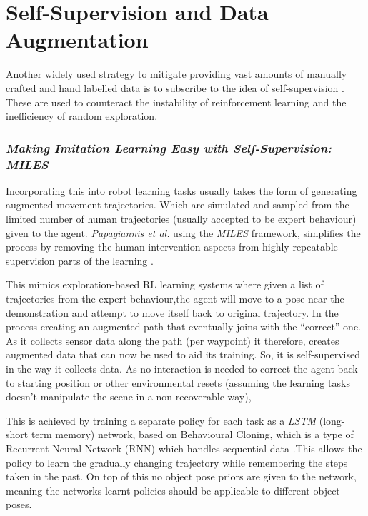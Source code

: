 \section{Self-Supervision and Data Augmentation}
Another widely used strategy to mitigate providing vast amounts of manually crafted and hand labelled data is to subscribe to the idea of self-supervision . These are used to counteract the instability of reinforcement learning and the inefficiency of random exploration.

\subsubsection{\emph{Making Imitation Learning Easy with Self-Supervision: MILES}}
Incorporating this into robot learning tasks usually takes the form of generating augmented movement trajectories. Which are simulated and sampled from the limited number of human trajectories (usually accepted to be expert behaviour) given to the agent. \emph{Papagiannis et al.} using the \emph{MILES} framework, simplifies the process by removing the human intervention aspects from highly repeatable supervision parts of the learning \cite{papagiannis2024milesmakingimitationlearning}. 

This mimics exploration-based RL learning systems where given a list of trajectories from the expert behaviour,the agent will move to a pose near the demonstration and attempt to move itself back to original trajectory. In the process creating an augmented path that eventually joins with the ``correct'' one. As it collects sensor data along the path (per waypoint) it therefore, creates augmented data that can now be used to aid its training. So, it is self-supervised in the way it collects data. As no interaction is needed to correct the agent back to starting position or other environmental resets (assuming the learning tasks doesn't manipulate the scene in a non-recoverable way),

This is achieved by training a separate policy for each task as a \emph{LSTM} (long-short term memory) network, based on Behavioural Cloning, which is a type of Recurrent Neural Network (RNN) which handles sequential data \cite{medsker2001recurrent}.This allows the policy to learn the gradually changing trajectory while remembering the steps taken in the past. On top of this no object pose priors are given to the network, meaning the networks learnt policies should be applicable to different object poses.


